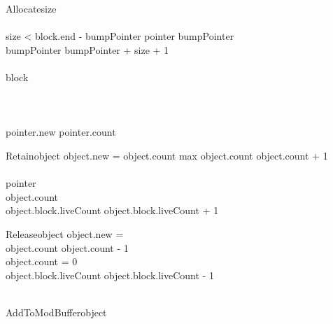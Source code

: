 \documentclass{beamer}
\begin{document}
\begin{frame}
\begin{pseudocode}{Allocate}{size}
	\\\\
	\IF size < block.end - bumpPointer \THEN
		\BEGIN
			pointer \GETS bumpPointer\\
			bumpPointer \GETS bumpPointer + size + 1\\
		\END\\
	\ELSE
		\BEGIN
			block \GETS {}\\
			\\
		\END\\\\
	pointer.new \GETS \TRUE
	pointer.count 
\end{pseudocode}
\end{frame}


\begin{frame}
\begin{pseudocode}{Retain}{object}
	\IF object.new = \FALSE \THEN
	\BEGIN
		\IF object.count \NOT max \THEN
		object.count \GETS object.count + 1\\
		\RETURN{}
	\END\\
	pointer \GETS {}\\
	object.count \\
	object.block.liveCount \GETS object.block.liveCount + 1
	\RETURN{}\\
\end{pseudocode}
\end{frame}

\begin{frame}
\begin{pseudocode}{Release}{object}
	\IF object.new = \TRUE \THEN
		\RETURN{}\\
	object.count \GETS object.count - 1\\
	\IF object.count = 0 \THEN
	\BEGIN
		\\
		object.block.liveCount \GETS object.block.liveCount - 1\\
		\\
	\END
\end{pseudocode}
\end{frame}

\addtocounter{section}{1}

\begin{frame}
\begin{pseudocode}{AddToModBuffer}{object}
	\\
\end{pseudocode}
\end{frame}
\end{document}
